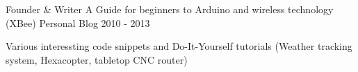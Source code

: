 

\begin{cventries}

  \cventry
    {Founder \& Writer} %
    {A Guide for beginners to Arduino and wireless technology (XBee)} %
    {Personal Blog} %
    {2010 - 2013} %
    {
      \begin{cvitems} %
        \item {Various interessting code snippets and Do-It-Yourself tutorials (Weather tracking system, Hexacopter, tabletop CNC router)}
      \end{cvitems}
    }


\end{cventries}
